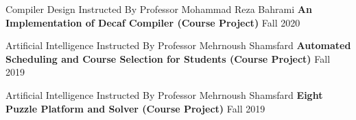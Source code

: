 \begin{cventries}
    \cventry
    {Compiler Design Instructed By Professor Mohammad Reza Bahrami}
    {\textbf {An Implementation of Decaf Compiler (Course Project)}}
    {}
    {Fall 2020}
    {}
    \vspace{0.35 cm}

    \cventry
    {Artificial Intelligence Instructed By Professor Mehrnoush Shamsfard}
    {\textbf {Automated Scheduling and Course Selection for Students (Course Project)}}
    {}
    {Fall 2019}
    {}
    \vspace{0.35 cm}

    \cventry
    {Artificial Intelligence Instructed By Professor Mehrnoush Shamsfard}
    {\textbf {Eight Puzzle Platform and Solver (Course Project)}}
    {}
    {Fall 2019}
    {}
    
\end{cventries}